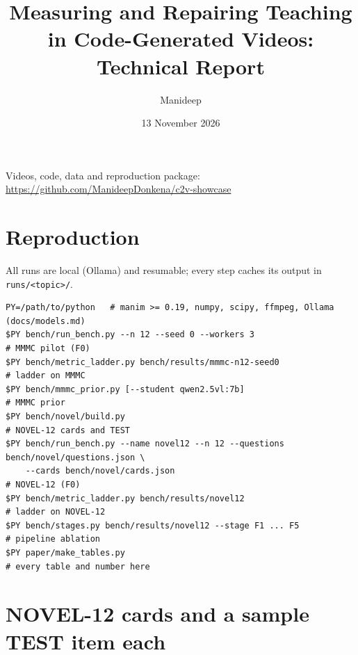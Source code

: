 \documentclass[11pt]{article}
\title{Measuring and Repairing Teaching in Code-Generated Videos:\\Technical Report}
\author{Manideep}
\date{13 November 2026}
\begin{document}
\maketitle
\begin{center}\small Videos, code, data and reproduction package: \url{https://github.com/ManideepDonkena/c2v-showcase}\end{center}
\tableofcontents














\appendix
\section{Reproduction}
All runs are local (Ollama) and resumable; every step caches its output in \texttt{runs/<topic>/}.
{\footnotesize
\begin{verbatim}
PY=/path/to/python   # manim >= 0.19, numpy, scipy, ffmpeg, Ollama (docs/models.md)
$PY bench/run_bench.py --n 12 --seed 0 --workers 3                      # MMMC pilot (F0)
$PY bench/metric_ladder.py bench/results/mmmc-n12-seed0                 # ladder on MMMC
$PY bench/mmmc_prior.py [--student qwen2.5vl:7b]                        # MMMC prior
$PY bench/novel/build.py                                                # NOVEL-12 cards and TEST
$PY bench/run_bench.py --name novel12 --n 12 --questions bench/novel/questions.json \
    --cards bench/novel/cards.json                                      # NOVEL-12 (F0)
$PY bench/metric_ladder.py bench/results/novel12                        # ladder on NOVEL-12
$PY bench/stages.py bench/results/novel12 --stage F1 ... F5             # pipeline ablation
$PY paper/make_tables.py                                                # every table and number here
\end{verbatim}}

\section{NOVEL-12 cards and a sample TEST item each}




\end{document}
